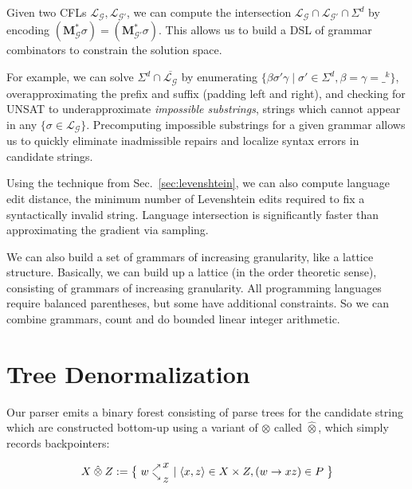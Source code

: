 \documentclass[sigplan,review,anonymous,acmsmall]{acmart}\settopmatter{printfolios=false,printccs=false,printacmref=false}
\begin{document}
Given two CFLs $\mathcal{L}_\mathcal{G}, \mathcal{L}_{\mathcal{G}'}$, we can compute the intersection $\mathcal{L}_\mathcal{G}\cap\mathcal{L}_{\mathcal{G}'}\cap\Sigma^d$ by encoding $(\mathbf{M}_\mathcal{G}^*\sigma) = (\mathbf{M}_{\mathcal{G}'}^*\sigma)$. This allows us to build a DSL of grammar combinators to constrain the solution space.

For example, we can solve $\Sigma^d \cap \overline{\mathcal{L}_\mathcal{G}}$ by enumerating $\{\beta\sigma'\gamma \mid \sigma' \in \Sigma^d, \beta = \gamma = \_^k\}$, overapproximating the prefix and suffix (padding left and right), and checking for UNSAT to underapproximate \textit{impossible substrings}, strings which cannot appear in any $\{\sigma \in \mathcal{L}_\mathcal{G}\}$. Precomputing impossible substrings for a given grammar allows us to quickly eliminate inadmissible repairs and localize syntax errors in candidate strings.

Using the technique from Sec.~\ref{sec:levenshtein}, we can also compute language edit distance, the minimum number of Levenshtein edits required to fix a syntactically invalid string. Language intersection is significantly faster than approximating the gradient via sampling.

We can also build a set of grammars of increasing granularity, like a lattice structure. Basically, we can build up a lattice (in the order theoretic sense), consisting of grammars of increasing granularity. All programming languages require balanced parentheses, but some have additional constraints. So we can combine grammars, count and do bounded linear integer arithmetic.

\section{Tree Denormalization}


Our parser emits a binary forest consisting of parse trees for the candidate string which are constructed bottom-up using a variant of $\otimes$ called $\hat{\otimes}$, which simply records backpointers:

\begin{align}
   X\:\hat{\otimes}\:Z := \big\{\;w\hphantom{.}^{\nearrow}_{\searrow}\nobarfrac{x}{z} \mid \langle x, z\rangle \in X \times Z, (w\rightarrow xz) \in P\;\big\}
\end{align}
\end{document}
